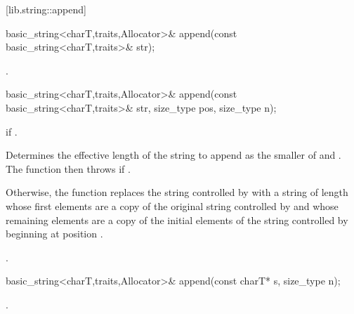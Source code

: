[lib.string::append]{}

%
%
\begin{itemdecl}
basic_string<charT,traits,Allocator>&
  append(const basic_string<charT,traits>& str);
\end{itemdecl}

\begin{itemdescr}
\pnum
\returns {}.
\end{itemdescr}

%
%
\begin{itemdecl}
basic_string<charT,traits,Allocator>&
  append(const basic_string<charT,traits>& str, size_type pos, size_type n);
\end{itemdecl}

\begin{itemdescr}
\pnum
\requires
{}

\pnum
\throws
{}
if
.

\pnum
\effects
Determines the effective length 
of the string to append as the smaller of  and
.
The function then throws  if .

Otherwise, the function replaces the string controlled by  with
a string of length  whose first  elements
are a copy of the original string controlled by  and whose
remaining elements are a copy of the initial elements of the string controlled
by  beginning at position .

\pnum
\returns
{}.
\end{itemdescr}

%
%
\begin{itemdecl}
basic_string<charT,traits,Allocator>&
  append(const charT* s, size_type n);
\end{itemdecl}

\begin{itemdescr}
\pnum
\returns
{}.
\end{itemdescr}

